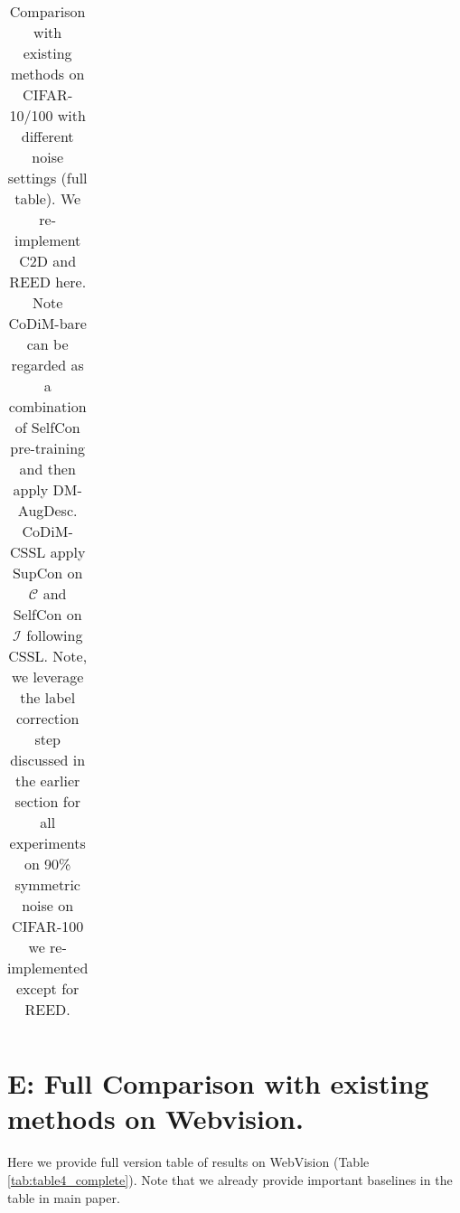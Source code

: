 \documentclass[letterpaper]{article} \usepackage{aaai22}  \usepackage{times}  \usepackage{helvet}  \usepackage{courier}  \usepackage[hyphens]{url}  \usepackage{graphicx} \usepackage{subfigure}
\begin{document}
\begin{table*}[h]
\begin{center}
\begin{tabular}{lcccccccccc}
\hline
\end{tabular}
\end{center}
\caption{Comparison with existing methods on CIFAR-10/100 with different noise settings (full table). We re-implement C2D and REED here. Note CoDiM-bare can be regarded as a combination of SelfCon pre-training and then apply DM-AugDesc. CoDiM-CSSL apply SupCon on $\mathcal{C}$ and SelfCon on $\mathcal{I}$ following CSSL. Note, we leverage the label correction step discussed in the earlier section for all experiments on 90\% symmetric noise on CIFAR-100 we re-implemented except for REED.}
\label{tab:table2_complete}
\end{table*}


\section{E: Full Comparison with existing methods on Webvision.}
Here we provide full version table of results on WebVision (Table \ref{tab:table4_complete}). Note that we already provide important baselines in the table in main paper.
\end{document}
